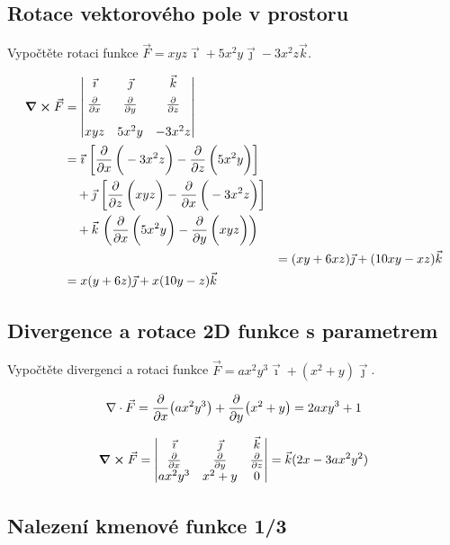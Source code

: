 \konec

\subsection{Rotace vektorového pole v prostoru}

Vypočtěte rotaci funkce $\vec F=xyz\vec \imath + 5x^2y\vec\jmath-3x^2z\vec k$.

\reseni

 $$
 \begin{aligned}
\curl \vec F&=
 \begin{vmatrix}
   \vec\imath & \vec \jmath & \vec k\\[4pt]
   \pdv{x} & \pdv{y} & \pdv{z} \\[10pt]
   xyz& 5x^2y & -3x^2z
 \end{vmatrix}\\
 &=
\vec \imath \ \qty[\pd[x]{-3x^2z}-\pd[z]{5x^2y}]
\\&\quad +\vec \jmath \ \qty[\pd[z]{xyz}-\pd[x]{-3x^2z}] 
\\&\quad +\vec k\ \qty({\pd[x]{5x^2y}-\pd[y]{xyz}})\\&
 &=(xy+6xz)\vec\jmath + (10xy-xz)\vec k
\\&=x(y+6z)\vec\jmath + x(10y-z)\vec k
\end{aligned}
 $$



\konec

\subsection{Divergence a rotace 2D funkce s parametrem}
Vypočtěte divergenci a rotaci funkce $\vec F=ax^2y^3\vec \imath + (x^2+y)\vec\jmath$.

\reseni

$$\nabla\cdot \vec F=\pdv{x}(ax^2y^3)+\pdv{y}(x^2+y)=2axy^3+1$$

 $$\curl \vec F=
 \begin{vmatrix}
   \vec\imath & \vec \jmath & \vec k\\
   \pdv{x} & \pdv{y} & \pdv{z} \\
   ax^2y^3 & x^2+y & 0
 \end{vmatrix}
 =\vec k(2x-3ax^2y^2)
 $$

\konec


\subsection{Nalezení kmenové funkce 1/3}

